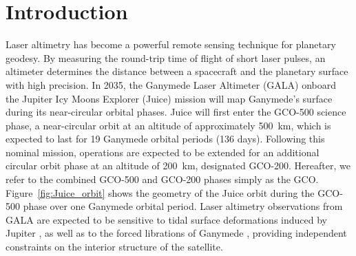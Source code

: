\documentclass[pdflatex,sn-mathphys-num]{sn-jnl}%
\theoremstyle{thmstyleone}%
\theoremstyle{thmstyletwo}%
\theoremstyle{thmstylethree}%
\begin{document}






\section{Introduction}

Laser altimetry has become a powerful remote sensing technique for planetary geodesy. By measuring the round-trip time of flight of short laser pulses, an altimeter determines the distance between a spacecraft and the planetary surface with high precision.
%
In 2035, the Ganymede Laser Altimeter (GALA) onboard the Jupiter Icy Moons Explorer (Juice) mission will map Ganymede's surface during its near-circular orbital phases. Juice will first enter the GCO-500 science phase, a near-circular orbit at an altitude of approximately \SI{500}{km}, which is expected to last for 19 Ganymede orbital periods (136 days).
%
Following this nominal mission, operations are expected to be extended for an additional circular orbit phase at an altitude of \SI{200}{km}, designated GCO-200. Hereafter, we refer to the combined GCO-500 and GCO-200 phases simply as the GCO. Figure~\ref{fig:Juice_orbit} shows the geometry of the Juice orbit during the GCO-500 phase over one Ganymede orbital period.
%
Laser altimetry observations from GALA are expected to be sensitive to tidal surface deformations induced by Jupiter \citep{2015P&SS..117..184S}, as well as to the forced librations of Ganymede \citep{2019Geosc...9..320S}, providing independent constraints on the interior structure of the satellite.
\end{document}
